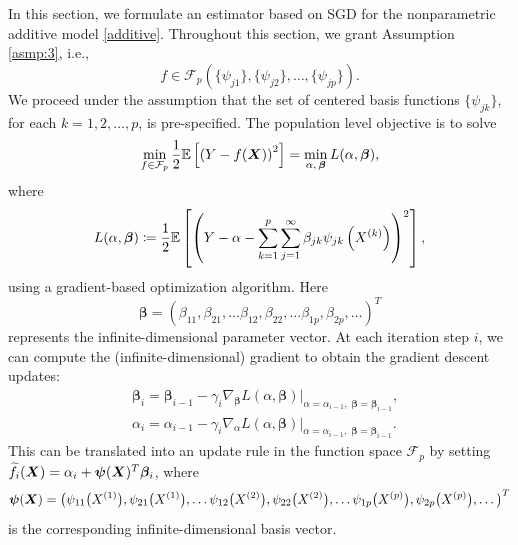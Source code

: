 In this section, we formulate an estimator based on SGD for the   nonparametric additive model \eqref{additive}. Throughout this section, we grant Assumption \ref{asmp:3}, i.e., 
$$f\in \mathcal{F}_p(\{\psi_{j1}\},\{\psi_{j2}\},\dots,\{\psi_{jp}\}).$$ 
We proceed under the assumption that the set of centered basis functions $\{\psi_{jk}\}$, for each $k=1,2,\dots,p$, is pre-specified. The population level objective is to solve
\begin{align*}
    \min_{f \in \mathcal{F}_p}\frac{1}{2} \mathbb{E} \left[\left( Y - f(\bm{X})
 \right)^2\right] = \min_{\alpha,\, \boldsymbol{\beta}}  L(\alpha, \boldsymbol{\beta}),
\end{align*}
where
\begin{align*}
     L(\alpha, \boldsymbol{\beta}) \coloneqq \frac{1}{2}\mathbb{E} \left[\left( Y - \alpha - \sum_{k=1}^p\sum_{j=1}^{\infty}\beta_{jk}\psi_{jk}\left(X^{(k)} \right)
 \right)^2\right],
\end{align*}
using a gradient-based optimization algorithm.
Here $$\boldsymbol{\beta} = (\beta_{11}, \beta_{21}, \dots \beta_{12}, \beta_{22}, \dots \beta_{1p}, \beta_{2p}, \dots)^T$$ represents the infinite-dimensional parameter vector. At each iteration step $ i $,
we can compute the (infinite-dimensional) gradient to obtain the gradient descent updates:
\begin{align*}
&\boldsymbol{\beta}_i = \boldsymbol{\beta}_{i-1} - \gamma_i \nabla_{\boldsymbol{\beta}}L(\alpha, \boldsymbol{\beta})\vert_{\alpha = \alpha_{i-1},\; \boldsymbol{\beta}=\boldsymbol{\beta}_{i-1}},\\
& \alpha_i = \alpha_{i-1} - \gamma_i\nabla_{\alpha}L(\alpha, \boldsymbol{\beta})\vert_{\alpha = \alpha_{i-1},\; \boldsymbol{\beta}=\boldsymbol{\beta}_{i-1}}.
\end{align*}
This can be translated into an update rule in the function space $\mathcal{F}_p$ by setting $ \widetilde{f}_i(\bm{X}) = \alpha_i + \boldsymbol{\psi}(\bm{X})^T\boldsymbol{\beta}_i $, where $$\boldsymbol{\psi}(\bm{X}) = \big(\psi_{11}\big(X^{(1)}\big), \psi_{21}\big(X^{(1)}\big), \dots \psi_{12}\big(X^{(2)}\big), \psi_{22}\big(X^{(2)}\big), \dots \psi_{1p}\big(X^{(p)}\big), \psi_{2p}\big(X^{(p)}\big), \dots\big)^T$$ is the corresponding infinite-dimensional basis vector. 

